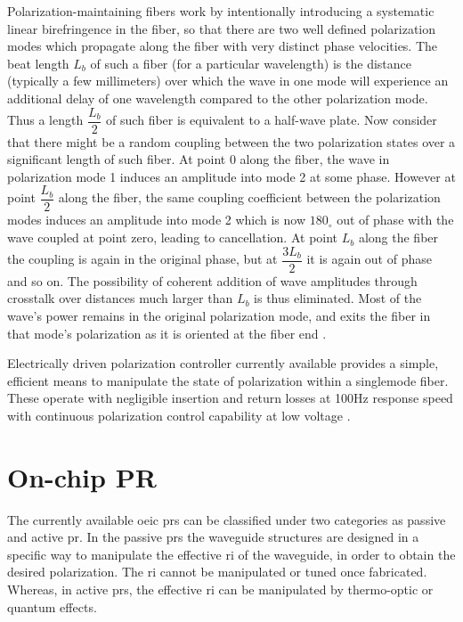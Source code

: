 \documentclass[../report.tex]{subfiles}
\begin{document}
Polarization-maintaining fibers work by intentionally introducing a systematic linear birefringence in the fiber, so that there are two well defined polarization modes which propagate along the fiber with very distinct phase velocities. The beat length $L_b$ of such a fiber (for a particular wavelength) is the distance (typically a few millimeters) over which the wave in one mode will experience an additional delay of one wavelength compared to the other polarization mode. Thus a length $\dfrac{L_b}{2}$ of such fiber is equivalent to a half-wave plate. Now consider that there might be a random coupling between the two polarization states over a significant length of such fiber. At point 0 along the fiber, the wave in polarization mode 1 induces an amplitude into mode 2 at some phase. However at point $\dfrac{L_b}{2}$ along the fiber, the same coupling coefficient between the polarization modes induces an amplitude into mode 2 which is now $180_\circ$ out of phase with the wave coupled at point zero, leading to cancellation. At point $L_b$ along the fiber the coupling is again in the original phase, but at $\dfrac{3L_b}{2}$ it is again out of phase and so on. The possibility of coherent addition of wave amplitudes through crosstalk over distances much larger than $L_b$ is thus eliminated. Most of the wave's power remains in the original polarization mode, and exits the fiber in that mode's polarization as it is oriented at the fiber end \cite{polarization_maintaining_fiber}. \par	

Electrically driven polarization controller currently available provides a simple, efficient means to manipulate the state of polarization within a singlemode fiber. These operate with negligible insertion and return losses at 100Hz response speed with continuous polarization control capability at low voltage \cite{polarization_maintaining_device}.
		
	\section{On-chip PR}
The currently available \gls{oeic} \gls{pr}s can be classified under two categories as passive and active \gls{pr}. In the passive \gls{pr}s the waveguide structures are designed in a specific way to manipulate the effective \gls{ri} of the waveguide, in order to obtain the desired polarization. The \gls{ri} cannot be manipulated or tuned once fabricated. Whereas, in active \gls{pr}s, the effective \gls{ri} can be manipulated by thermo-optic or quantum effects.
	
\end{document}
